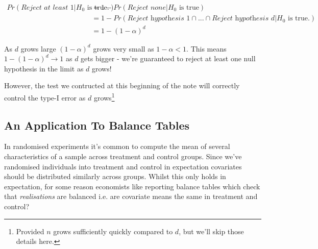 \documentclass{article}
\newtheorem{corollary}{Corollary}[theorem]
\begin{document}
    \begin{align*}
        Pr(\textit{Reject at least } 1 | H_0 \text{ is true.}) &= 1 - Pr(\textit{Reject none} | H_0 \text{ is true}) \\
        &= 1 - Pr(\textit{Reject hypothesis 1} \cap  ... \cap \textit{Reject hypothesis d} | H_0 \text{ is true.}) \\
        &= 1 - (1 - \alpha)^d
    \end{align*}


    As $d$ grows large $(1 - \alpha)^d$ grows very small as $1 - \alpha < 1$. This means
    $1 - (1 - \alpha)^d \rightarrow 1$ as $d$ gets bigger - we're guaranteed to 
    reject at least one null hypothesis in the limit as $d$ grows!


    However, the test we contructed at this beginning of the note will correctly 
    control the type-I error as $d$ grows\footnote{Provided $n$ grows sufficiently 
    quickly compared to $d$, but we'll skip those details here.}




    \subsection*{An Application To Balance Tables}


    In randomised experiments it's common to compute the mean of several 
    characteristics of a sample across treatment and control groups.  Since we've
    randomised individuals into treatment and control in expectation covariates 
    should be distributed similarly across groups. Whilst this only holds in 
    expectation, for some reason economists like reporting balance tables which 
    check that \textit{realisations} are balanced i.e. are covariate means the same 
    in treatment and control?
    
    
    
    
    
    
    
    
    
\end{document}
